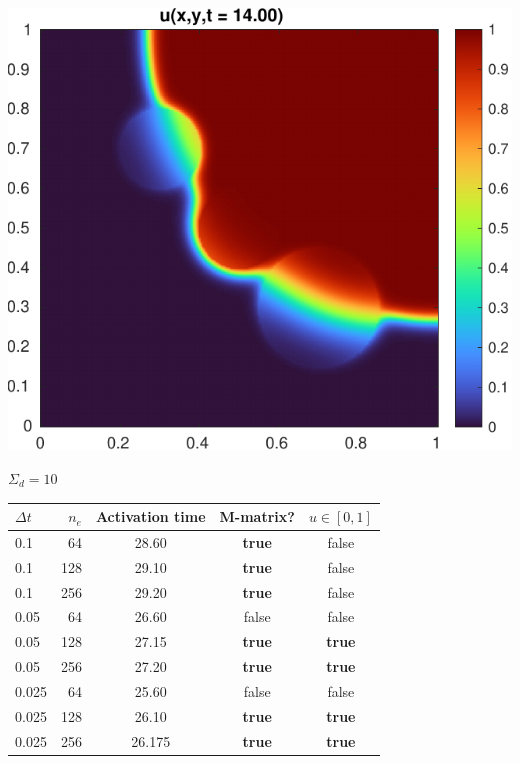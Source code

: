 \documentclass[14pt,aspectratio=169]{beamer}
\begin{document}
\begin{frame}
	\centering
	\includegraphics[height=\textheight]{figs/S10.pdf}
\end{frame}

\begin{frame}{$\Sigma_d = 10$}
	\begin{table}[H]
		\centering
		\begin{tabular}{l|r|ccc}
			$\Delta t$ & $n_e$ & Activation time & M-matrix?     & $u \in [0, 1]$ \\
			\hline
			0.1        & 64    & 28.60           & \textbf{true} & false          \\
			0.1        & 128   & 29.10           & \textbf{true} & false          \\
			0.1        & 256   & 29.20           & \textbf{true} & false          \\
			0.05       & 64    & 26.60           & false         & false          \\
			0.05       & 128   & 27.15           & \textbf{true} & \textbf{true}  \\
			0.05       & 256   & 27.20           & \textbf{true} & \textbf{true}  \\
			0.025      & 64    & 25.60           & false         & false          \\
			0.025      & 128   & 26.10           & \textbf{true} & \textbf{true}  \\
			0.025      & 256   & 26.175          & \textbf{true} & \textbf{true}  \\
		\end{tabular}
	\end{table}
\end{frame}
\end{document}
